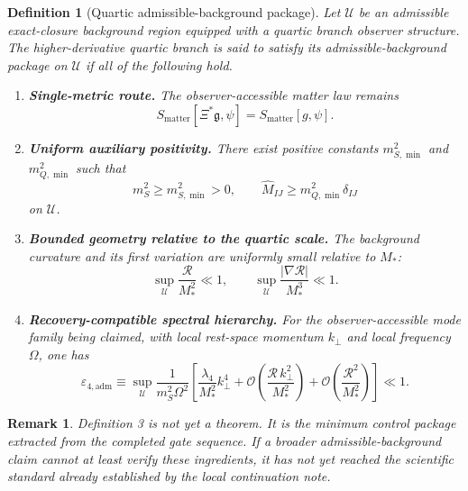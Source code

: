 \documentclass[11pt]{article}
\newcommand{\BridgeMetric}{\mathfrak{g}}
\newtheorem{definition}{Definition}
\newtheorem{remark}{Remark}
\begin{document}
\begin{definition}[Quartic admissible-background package]
Let \(\mathcal U\) be an admissible exact-closure background region equipped with a quartic branch observer structure. The higher-derivative quartic branch is said to satisfy its admissible-background package on \(\mathcal U\) if all of the following hold.
\begin{enumerate}
    \item \textbf{Single-metric route.} The observer-accessible matter law remains
    \begin{equation}
    S_{\mathrm{matter}}[\Xi^*\BridgeMetric,\psi]
    =
    S_{\mathrm{matter}}[g,\psi].
    \label{eq:matterroute}
    \end{equation}
    \item \textbf{Uniform auxiliary positivity.} There exist positive constants \(m_{S,\min}^2\) and \(m_{Q,\min}^2\) such that
    \begin{equation}
    m_S^2\ge m_{S,\min}^2>0,
    \qquad
    \widehat M_{IJ}\ge m_{Q,\min}^2\delta_{IJ}
    \label{eq:uniformpositivity}
    \end{equation}
    on \(\mathcal U\).
    \item \textbf{Bounded geometry relative to the quartic scale.} The background curvature and its first variation are uniformly small relative to \(M_*\):
    \begin{equation}
    \sup_{\mathcal U}\frac{\mathcal R}{M_*^2}\ll 1,
    \qquad
    \sup_{\mathcal U}\frac{|\nabla\mathcal R|}{M_*^3}\ll 1.
    \label{eq:boundedgeometry}
    \end{equation}
    \item \textbf{Recovery-compatible spectral hierarchy.} For the observer-accessible mode family being claimed, with local rest-space momentum \(k_\perp\) and local frequency \(\Omega\), one has
    \begin{equation}
    \varepsilon_{4,\mathrm{adm}}
    \equiv
    \sup_{\mathcal U}
    \frac{1}{m_S^2\Omega^2}
    \left[
    \frac{\lambda_4}{M_*^2}k_\perp^4
    + \mathcal O\!\left(\frac{\mathcal R\,k_\perp^2}{M_*^2}\right)
    + \mathcal O\!\left(\frac{\mathcal R^2}{M_*^2}\right)
    \right]
    \ll 1.
    \label{eq:epsadm}
    \end{equation}
\end{enumerate}
\end{definition}

\begin{remark}
Definition 3 is not yet a theorem. It is the minimum control package extracted from the completed gate sequence. If a broader admissible-background claim cannot at least verify these ingredients, it has not yet reached the scientific standard already established by the local continuation note.
\end{remark}
\end{document}
